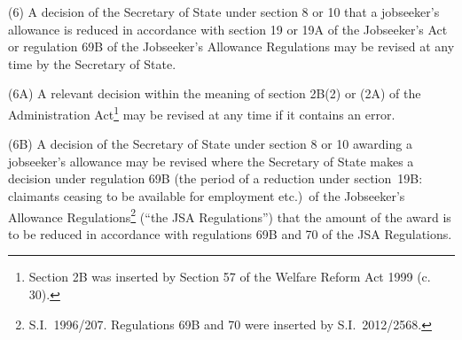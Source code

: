 \documentclass[12pt,a4paper]{article}
\begin{document}

(6) A decision of the Secretary of State under section 8 or 10 that a jobseeker’s allowance is reduced in accordance with section 19 or 19A of the Jobseeker’s Act or regulation 69B of the Jobseeker’s Allowance Regulations may be revised at any time by the Secretary of State.

(6A) A relevant decision within the meaning of section 2B(2) 
or (2A)  %
of the Administration Act\footnote{\frenchspacing Section 2B was inserted by Section 57 of the Welfare Reform Act 1999 (c. 30).} may be revised at any time if it contains an error.

(6B) A decision of the Secretary of State under section 8 or 10 awarding a jobseeker’s allowance may be revised where the Secretary of State makes a decision under regulation 69B (the period of a reduction under section~19B: claimants ceasing to be available for employment etc.)\ of the Jobseeker’s Allowance Regulations\footnote{S.I.~1996/207. Regulations 69B and 70 were inserted by S.I.~2012/2568.} (“the JSA Regulations”) that the amount of the award is to be reduced in accordance with regulations 69B and 70 of the JSA Regulations.

%
\end{document}
